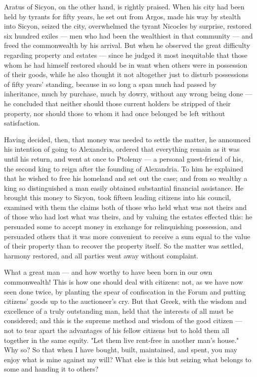  Aratus of Sicyon, on the other hand, is rightly praised. When his city had been held by tyrants for fifty years, he set out from Argos, made his way by stealth into Sicyon, seized the city, overwhelmed the tyrant Nicocles by surprise, restored six hundred exiles — men who had been the wealthiest in that community — and freed the commonwealth by his arrival. But when he observed the great difficulty regarding property and estates — since he judged it most inequitable that those whom he had himself restored should be in want when others were in possession of their goods, while he also thought it not altogether just to disturb possessions of fifty years' standing, because in so long a span much had passed by inheritance, much by purchase, much by dowry, without any wrong being done — he concluded that neither should those current holders be stripped of their property, nor should those to whom it had once belonged be left without satisfaction.

 Having decided, then, that money was needed to settle the matter, he announced his intention of going to Alexandria, ordered that everything remain as it was until his return, and went at once to Ptolemy — a personal guest-friend of his, the second king to reign after the founding of Alexandria. To him he explained that he wished to free his homeland and set out the case; and from so wealthy a king so distinguished a man easily obtained substantial financial assistance. He brought this money to Sicyon, took fifteen leading citizens into his council, examined with them the claims both of those who held what was not theirs and of those who had lost what was theirs, and by valuing the estates effected this: he persuaded some to accept money in exchange for relinquishing possession, and persuaded others that it was more convenient to receive a sum equal to the value of their property than to recover the property itself. So the matter was settled, harmony restored, and all parties went away without complaint.

 What a great man — and how worthy to have been born in our own commonwealth! This is how one should deal with citizens: not, as we have now seen done twice, by planting the spear of confiscation in the Forum and putting citizens' goods up to the auctioneer's cry. But that Greek, with the wisdom and excellence of a truly outstanding man, held that the interests of all must be considered; and this is the supreme method and wisdom of the good citizen — not to tear apart the advantages of his fellow citizens but to hold them all together in the same equity. "Let them live rent-free in another man's house." Why so? So that when I have bought, built, maintained, and spent, you may enjoy what is mine against my will? What else is this but seizing what belongs to some and handing it to others?

